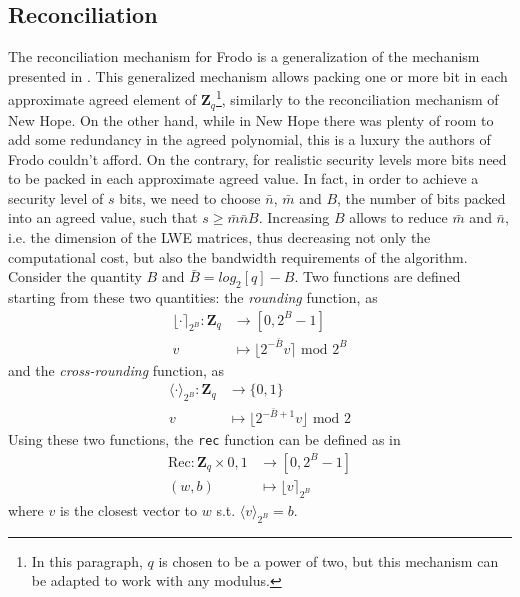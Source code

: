 \subsection{Reconciliation}
The reconciliation mechanism for Frodo is a generalization of the mechanism presented in \cite{peikert_2014}. This generalized mechanism allows packing one or more bit in each approximate agreed element of $\mathbf{Z}_q$\footnote{In this paragraph, $q$ is chosen to be a power of two, but this mechanism can be adapted to work with any modulus.}, similarly to the reconciliation mechanism of New Hope. On the other hand, while in New Hope there was plenty of room to add some redundancy in the agreed polynomial, this is a luxury the authors of Frodo couldn't afford. On the contrary, for realistic security levels more bits need to be packed in each approximate agreed value. In fact, in order to achieve a security level of $s$ bits, we need to choose $\bar{n}$, $\bar{m}$ and $B$, the number of bits packed into an agreed value, such that $s\ge\bar{m}\bar{n}B$. Increasing $B$ allows to reduce $\bar{m}$ and $\bar{n}$, i.e. the dimension of the LWE matrices, thus decreasing not only the computational cost, but also the bandwidth requirements of the algorithm.\\
Consider the quantity $B$ and $\bar{B}=log_2[q]-B$. Two functions are defined starting from these two quantities: the \textit{rounding} function, as
\begin{align*}
\lfloor \cdot \rceil_{2^B} : \mathbf{Z}_q &\rightarrow [0,2^B-1] \\
v &\mapsto \lfloor 2^{-\bar{B}}v \rceil\text{ mod }2^B
\end{align*}
and the \textit{cross-rounding} function, as
\begin{align*}
\langle \cdot \rangle_{2^B} : \mathbf{Z}_q &\rightarrow \{0,1\}\\
v &\mapsto \lfloor 2^{-\bar{B}+1}v \rfloor\text{ mod }2
\end{align*}
Using these two functions, the \verb|rec| function can be defined as in \cite{peikert_2014}
\begin{align*}
\text{Rec} : \mathbf{Z}_q \times {0,1} &\rightarrow [0,2^B-1]\\
(w,b) &\mapsto \lfloor v \rceil_{2^B}
\end{align*}
where $v$ is the closest vector to $w$ s.t. $\langle v \rangle_{2^B} = b$.\\

